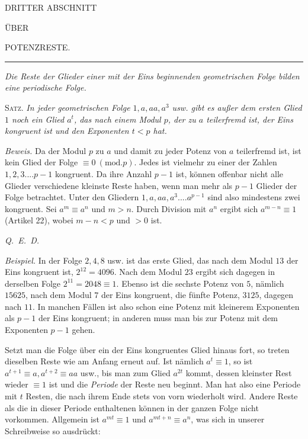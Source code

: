 \begin{center}
{\Large DRITTER ABSCHNITT}\par\bigskip
{\small ÜBER}\par\bigskip
{\Large POTENZRESTE.}
\end{center}

\begin{center}\rule{0.09\linewidth}{0.3pt}\end{center}

\begin{center}\small\emph{Die Reste der Glieder einer mit der Eins beginnenden geometrischen Folge bilden eine periodische Folge.}\end{center}


\textsc{Satz.} \emph{In jeder geometrischen Folge $1,a,aa,a^3$ usw. gibt es außer dem ersten Glied $1$ noch ein Glied $a^t$, das nach einem Modul $p$, der zu $a$ teilerfremd ist, der Eins kongruent ist und den Exponenten $t<p$ hat.}

\emph{Beweis.} Da der Modul $p$ zu $a$ und damit zu jeder Potenz von $a$ teilerfremd ist, ist kein Glied der Folge $\equiv0\ (\mathrm{mod.}p)$. Jedes ist vielmehr zu einer der Zahlen $1,2,3....p-1$ kongruent. Da ihre Anzahl $p-1$ ist, können offenbar nicht alle Glieder verschiedene kleinste Reste haben, wenn man mehr als $p-1$ Glieder der Folge betrachtet. Unter den Gliedern $1,a,aa,a^3....a^{p-1}$ sind also mindestens zwei kongruent. Sei $a^m\equiv a^n$ und $m>n$. Durch Division mit $a^n$ ergibt sich $a^{m-n}\equiv1$ (Artikel 22), wobei $m-n<p$ und $>0$ ist.\par
\noindent\mbox{\emph{Q. E. D.}}

\emph{Beispiel.} In der Folge $2,4,8$ usw. ist das erste Glied, das nach dem Modul $13$ der Eins kongruent ist, $2^{12}=4096$. Nach dem Modul $23$ ergibt sich dagegen in derselben Folge $2^{11}=2048\equiv1$. Ebenso ist die sechste Potenz von $5$, nämlich $15625$, nach dem Modul $7$ der Eins kongruent, die fünfte Potenz, $3125$, dagegen nach $11$. In manchen Fällen ist also schon eine Potenz mit kleinerem Exponenten als $p-1$ der Eins kongruent; in anderen muss man bis zur Potenz mit dem Exponenten $p-1$ gehen.


Setzt man die Folge über ein der Eins kongruentes Glied hinaus fort, so treten dieselben Reste wie am Anfang erneut auf. Ist nämlich $a^t\equiv1$, so ist $a^{t+1}\equiv a,a^{t+2}\equiv aa$ usw., bis man zum Glied $a^{2t}$ kommt, dessen kleinster Rest wieder $\equiv1$ ist und die \emph{Periode} der Reste neu beginnt. Man hat also eine Periode mit $t$ Resten, die nach ihrem Ende stets von vorn wiederholt wird. Andere Reste als die in dieser Periode enthaltenen können in der ganzen Folge nicht vorkommen. Allgemein ist $a^{mt}\equiv1$ und $a^{mt+n}\equiv a^n$, was sich in unserer Schreibweise so ausdrückt:

